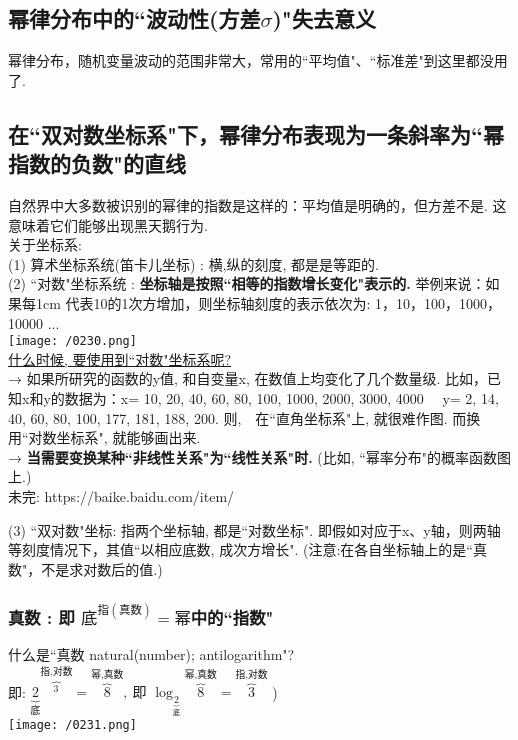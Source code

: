 \documentclass[UTF8]{ctexart}
\begin{document}
	
	
	\subsection{幂律分布中的``波动性(方差$\sigma$)"失去意义}
	幂律分布，随机变量波动的范围非常大，常用的``平均值"、``标准差"到这里都没用了. 
	
	
	\subsection{在``双对数坐标系"下，幂律分布表现为一条斜率为``幂指数的负数"的直线}
	
	自然界中大多数被识别的幂律的指数是这样的：平均值是明确的，但方差不是. 这意味着它们能够出现黑天鹅行为. \\
	
	关于坐标系: \\
	(1) 算术坐标系统(笛卡儿坐标) : 横,纵的刻度, 都是是等距的. \\
	
	(2) ``对数"坐标系统 : \textbf{坐标轴是按照``相等的指数增长变化"表示的.} 举例来说：如果每1cm 代表10的1次方增加，则坐标轴刻度的表示依次为: 1，10，100，1000，10000 ... \\
	
	\texttt{[image: /0230.png]} \\
	
	\underline{什么时候, 要使用到``对数"坐标系呢?}  \\
	→ 如果所研究的函数的y值, 和自变量x, 在数值上均变化了几个数量级. 比如，已知x和y的数据为：x= 10, 20, 40, 60, 80, 100, 1000, 2000, 3000, 4000 　y= 2, 14, 40, 60, 80, 100, 177, 181, 188, 200. 则,　在``直角坐标系"上, 就很难作图. 而换用``对数坐标系", 就能够画出来. \\
	→ \textbf{当需要变换某种``非线性关系"为``线性关系"时.} (比如, ``幂率分布"的概率函数图上.) \\
	
	未完:
	https://baike.baidu.com/item/%
	
	
	(3) ``双对数"坐标: 指两个坐标轴, 都是``对数坐标". 即假如对应于x、y轴，则两轴等刻度情况下，其值``以相应底数, 成次方增长". (注意:在各自坐标轴上的是``真数"，不是求对数后的值.) \\

	
	
	
	\subsubsection{真数 : 即 $\boxed{\text{底}^{\text{指}(\text{真数})}=\text{幂}}$中的``指数"}
	什么是``真数 natural(number); antilogarithm"? \\
	即: $
	\underset{\text{底}}{\underbrace{2}}\overset{\text{指,对数}}{\overbrace{^3}}=\overset{\text{幂,真数}}{\overbrace{8}},\ \text{即\ }\log _{\underset{\text{底}}{\underbrace{2}}}\overset{\text{幂,真数}}{\overbrace{8}}=\overset{\text{指,对数}}{\overbrace{3}}
	$ ) \\
	
\texttt{[image: /0231.png]} \\


	
	
	
	
	
	
	
	
	
	
\end{document}
